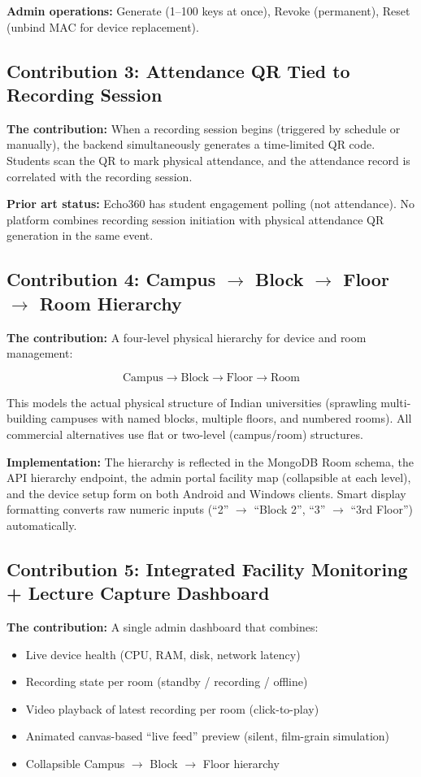 \documentclass[12pt,a4paper]{article}
\begin{document}
\textbf{Admin operations:} Generate (1--100 keys at once), Revoke (permanent), Reset (unbind MAC for device replacement).

\subsection{Contribution 3: Attendance QR Tied to Recording Session}

\textbf{The contribution:} When a recording session begins (triggered by schedule or manually), the backend simultaneously generates a time-limited QR code. Students scan the QR to mark physical attendance, and the attendance record is correlated with the recording session.

\textbf{Prior art status:} Echo360 has student engagement polling (not attendance). No platform combines recording session initiation with physical attendance QR generation in the same event.

\subsection{Contribution 4: Campus $\rightarrow$ Block $\rightarrow$ Floor $\rightarrow$ Room Hierarchy}

\textbf{The contribution:} A four-level physical hierarchy for device and room management:

\[
\text{Campus} \rightarrow \text{Block} \rightarrow \text{Floor} \rightarrow \text{Room}
\]

This models the actual physical structure of Indian universities (sprawling multi-building campuses with named blocks, multiple floors, and numbered rooms). All commercial alternatives use flat or two-level (campus/room) structures.

\textbf{Implementation:} The hierarchy is reflected in the MongoDB Room schema, the API hierarchy endpoint, the admin portal facility map (collapsible at each level), and the device setup form on both Android and Windows clients. Smart display formatting converts raw numeric inputs (``2'' $\rightarrow$ ``Block 2'', ``3'' $\rightarrow$ ``3rd Floor'') automatically.

\subsection{Contribution 5: Integrated Facility Monitoring + Lecture Capture Dashboard}

\textbf{The contribution:} A single admin dashboard that combines:
\begin{itemize}
    \item Live device health (CPU, RAM, disk, network latency)
    \item Recording state per room (standby / recording / offline)
    \item Video playback of latest recording per room (click-to-play)
    \item Animated canvas-based ``live feed'' preview (silent, film-grain simulation)
    \item Collapsible Campus $\rightarrow$ Block $\rightarrow$ Floor hierarchy
\end{itemize}
\end{document}
